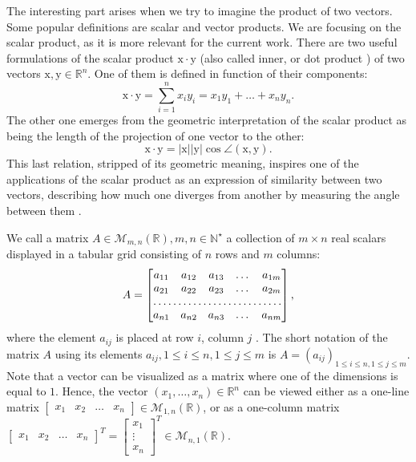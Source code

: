 \par The interesting part arises when we try to imagine the product of two vectors. Some popular definitions are scalar and vector products. We are focusing on the scalar product, as it is more relevant for the current work. There are two useful formulations of the scalar product $\mathrm{x}\cdot\mathrm{y}$ (also called inner, or dot product \cite{IntroVec}) of two vectors $\mathrm{x},\mathrm{y}\in\mathbb{R}^n$. One of them is defined in function of their components:
$$\mathrm{x}\cdot\mathrm{y}=\sum_{i=1}^{n}{x_i y_i}=x_1 y_1 + \ldots + x_n y_n.$$
The other one emerges from the geometric interpretation of the scalar product as being the length of the projection of one vector to the other:
$$\mathrm{x}\cdot\mathrm{y} = |\mathrm{x}||\mathrm{y}| \cos{\angle{(\mathrm{x},\mathrm{y})}}.$$
This last relation, stripped of its geometric meaning, inspires one of the applications of the scalar product as an expression of similarity between two vectors, describing how much one diverges from another by measuring the angle between them \cite{cossim}.

\par We call a matrix $A \in\mathcal{M}_{m,n}(\mathbb{R}), m,n\in\mathbb{N}^\star$ a collection of $m \times n$ real scalars displayed in a tabular grid consisting of $n$ rows and $m$ columns:
$$ A = \begin{bmatrix}
    a_{11}       & a_{12} & a_{13} & \dots & a_{1m} \\
    a_{21}       & a_{22} & a_{23} & \dots & a_{2m} \\
    \hdotsfor{5} \\
    a_{n1}       & a_{n2} & a_{n3} & \dots & a_{nm}
\end{bmatrix},$$
where the element $a_{i j}$ is placed at row $i$, column $j$ \cite{LinAlSchaum}.
The short notation of the matrix $A$ using its elements $a_{i j}, 1 \leq i \leq n, 1 \leq j \leq m$ is $A=(a_{i j})_{1 \leq i \leq n, 1 \leq j \leq m }$.
Note that a vector can be visualized as a matrix where one of the dimensions is equal to $1$. Hence, the vector $(x_1,\ldots,x_n)\in\mathbb{R}^n$ can be viewed either as a 
one-line matrix $ \begin{bmatrix} x_{1} & x_{2} & \dots & x_{n}  \end{bmatrix}\in \mathcal{M}_{1,n}(\mathbb{R}) $, or as a one-column matrix
$ \begin{bmatrix} x_{1} & x_{2} & \dots & x_{n}  \end{bmatrix}^T = \begin{bmatrix} x_{1} \\ \vdots \\ x_{n}  \end{bmatrix}^T \in \mathcal{M}_{n,1}(\mathbb{R}) $.

